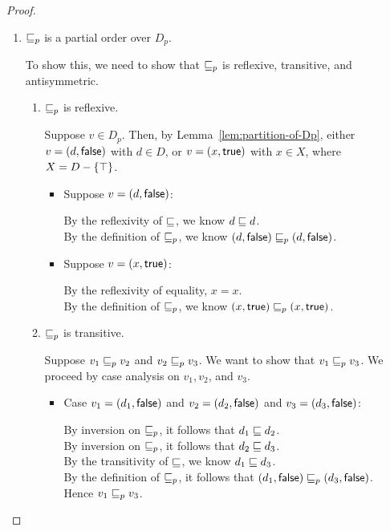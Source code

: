 \begin{proof}
~\begin{enumerate}
\item $\sqsubseteq_p$ is a partial order over $D_p$.

To show this, we need to show that $\sqsubseteq_p$ is reflexive, transitive,
and antisymmetric. 
\begin{enumerate}
\item $\sqsubseteq_p$ is reflexive.

  Suppose $v \in D_p$. Then, by Lemma~\ref{lem:partition-of-Dp},
  either $v = (d, \textsf{false})$ with $d \in D$, or $v = (x, \textsf{true})$ with $x \in X$, where $X = D - \left\{\top\right\}$.
  \begin{itemize}
  \item Suppose $v = (d, \textsf{false})$:

    By the reflexivity of $\sqsubseteq$, we know $d \sqsubseteq d$. \\ 
    By the definition of $\sqsubseteq_p$, we know $(d, \textsf{false}) \sqsubseteq_p (d, \textsf{false})$.

  \item Suppose $v = (x, \textsf{true})$: 
   
    By the reflexivity of equality, $x = x$. \\ 
    By the definition of $\sqsubseteq_p$, we know $(x, \textsf{true}) \sqsubseteq_p (x, \textsf{true})$. 
  \end{itemize}

\item $\sqsubseteq_p$ is transitive. 

  Suppose $v_1 \sqsubseteq_p v_2$ and $v_2 \sqsubseteq_p v_3$. We want to show that $v_1 \sqsubseteq_p v_3$. We
  proceed by case analysis on $v_1, v_2$, and $v_3$. 
  \begin{itemize}
  \item Case $v_1 = (d_1, \textsf{false})$ and $v_2 = (d_2, \textsf{false})$ and $v_3 = (d_3, \textsf{false})$:
    
    By inversion on $\sqsubseteq_p$, it follows that $d_1 \sqsubseteq d_2$. \\ 
    By inversion on $\sqsubseteq_p$, it follows that $d_2 \sqsubseteq d_3$. \\ 
    By the transitivity of $\sqsubseteq$, we know $d_1 \sqsubseteq d_3$. \\ 
    By the definition of $\sqsubseteq_p$, it follows that $(d_1, \textsf{false}) \sqsubseteq_p (d_3, \textsf{false})$. \\ 
    Hence $v_1 \sqsubseteq_p v_3$. 


\end{itemize}
\end{enumerate}
\end{enumerate}
\end{proof}
